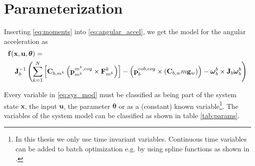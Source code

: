 %
%

\section{Parameterization}
\label{sec:parameterization}
Inserting \cref{eq:moments} into \cref{eq:angular_accel}, we get the model for the angular acceleration as
\begin{align}
\lefteqn{ \mathbf{f}(\mathbf{x}, \mathbf{u}, \boldsymbol{\theta}) = {} \label{eq:sys_mod} }\\
& & {} \mathbf{J}_b^{-1} \left( 
\sum_{k=1}^N  \left[  \mathbf{C}_{b,m^k} \left( \mathbf{p}^{m^k,cog}_{m^k} \times \mathbf{F}^k_{m^k} \right)  \right]
-
\left( \mathbf{p}^{cob,cog}_b \times (\mathbf{C}_{b,w}m\mathbf{g}_w) \right)
- \boldsymbol{\omega}_b^b \times \mathbf{J}_b \boldsymbol{\omega}_b^b \right) \nonumber
\end{align}

Every variable in \cref{eq:sys_mod} must be classified as being part of the system state $\mathbf{x}$, the input $\mathbf{u}$, the parameter $\boldsymbol{\theta}$ or as a (constant) known variable\footnote{In this thesis we only use time invariant variables.
Continuous time variables can be added to batch optimization e.g. by using spline functions as shown in \citep{Furgale2012}.}.
The variables of the system model can be classified as shown in table \ref{tab:params}.

